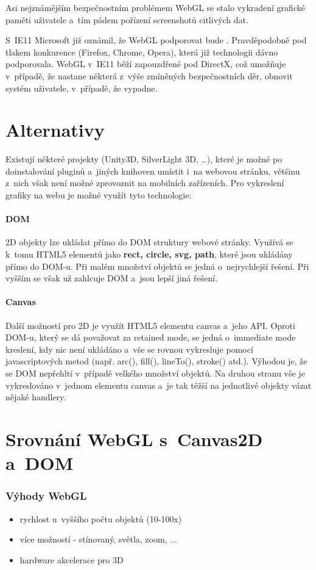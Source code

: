 \documentclass[12pt,a4paper,titlepage,final]{report}
\begin{document}
Asi nejznámějším bezpečnostním problémem WebGL se stalo vykradení grafické paměti uživatele \cite{gstealing} a~tím pádem pořízení screenshotů citlivých dat.

S~IE11 Microsoft již oznámil, že WebGL podporovat bude \cite{ie11}. Pravděpodobně pod tlakem konkurence (Firefox, Chrome, Opera), která již technologii dávno podporovala. WebGL v~IE11 běží zapouzdřené pod DirectX, což umožňuje v~případě, že nastane některá z~výše zmíněných bezpečnostních děr, obnovit systém uživatele, v~případě, že vypadne.

\section{Alternativy}
Existují některé projekty (Unity3D, SilverLight 3D, \dots), které je možné po doinstalování pluginů a~jiných knihoven umístit i~na webovou stránku, většinu z~nich však není možné zprovoznit na mobilních zařízeních. Pro vykreslení grafiky na webu je možné využít tyto technologie: 

\paragraph{DOM} 2D objekty lze ukládat přímo do DOM struktury webové stránky. Využívá se k~tomu HTML5 elementů jako \textbf{rect, circle, svg, path}, které jsou ukládány přímo do DOM-u. Při malém množství objektů se jedná o~nejrychlejší řešení. Při vyšším se však už zahlcuje DOM a~jsou lepší jiná řešení.

\paragraph{Canvas} Další možností pro 2D je využít HTML5 elementu canvas a~jeho API. Oproti DOM-u, který se dá považovat za retained mode, se jedná o~immediate mode kreslení, kdy nic není ukládáno a~vše se rovnou vykresluje pomocí javascriptových metod (např. arc(), fill(), lineTo(),  stroke() atd.). Výhodou je, že se DOM nepřehltí v~případě velkého množství objektů. Na druhou stranu vše je vykreslováno v~jednom elementu canvas a~je tak těžší na jednotlivé objekty vázat nějaké handlery.

\section{Srovnání WebGL s~Canvas2D a~DOM}

\subsubsection{Výhody WebGL}
\begin{itemize}
	\item rychlost u~vyššího počtu objektů (10-100x)
	\item více možností - stínovaný, světla, zoom, ...	
	\item hardware akcelerace pro 3D
\end{itemize}
\end{document}
